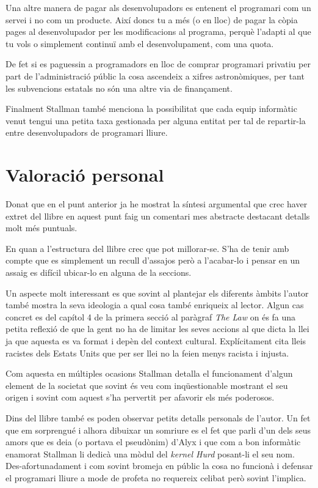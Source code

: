 \documentclass[a4paper,10pt]{scrartcl}
\begin{document}
Una altre manera de pagar als desenvolupadors es entenent
el programari com un servei i no com un producte. Així doncs
tu a més (o en lloc) de pagar la còpia pages al desenvolupador
per les modificacions al programa, perquè l'adapti al que tu vols
o simplement continuï amb el desenvolupament, com una quota.

De fet si es paguessin a programadors en lloc de comprar programari
privatiu per part de l'administració públic la cosa ascendeix
a xifres astronòmiques, per tant les subvencions estatals 
no són una altre via de finançament.

Finalment Stallman també menciona la possibilitat que cada
equip informàtic venut tengui una petita taxa gestionada per
alguna entitat per tal de repartir-la entre
desenvolupadors de programari lliure.

  \section{Valoració personal}
  
  Donat que en el punt anterior ja he mostrat la síntesi argumental que crec haver extret del llibre
en aquest punt faig un comentari mes abstracte destacant detalls molt més puntuals.

En quan a l'estructura del llibre crec que pot millorar-se. S'ha de tenir amb compte que es simplement
un recull d'assajos però a l'acabar-lo i pensar en un assaig es difícil ubicar-lo en alguna de la seccions.

Un aspecte molt interessant es que sovint al plantejar els diferents àmbits l'autor també mostra la seva ideologia
 a qual cosa també enriqueix al lector. Algun cas concret
es del capítol 4 de la primera secció al paràgraf \emph{The Law} on és fa una petita reflexió
de que la gent no ha de limitar les seves accions al que dicta la llei ja que aquesta es va format
i depèn del context cultural. Explícitament cita lleis racistes dels Estats Units que per ser llei
no la feien menys racista i injusta.

Com aquesta en múltiples ocasions Stallman detalla el funcionament d'algun element de la societat
que sovint és veu com inqüestionable mostrant el seu origen i sovint com aquest s'ha pervertit
per afavorir els més poderosos.

Dins del llibre també es poden observar petits detalls personals de l'autor. Un fet que em sorprengué
i alhora dibuixar un somriure es el fet que parli d'un dels seus amors que es deia (o portava el pseudònim)
d'Alyx i que com a bon informàtic enamorat Stallman li dedicà una mòdul del \emph{kernel Hurd} posant-li el seu nom.
Des-afortunadament i com sovint bromeja en públic la cosa no funcionà i defensar el programari lliure
a mode de profeta no requereix celibat però sovint l'implica.
\end{document}
